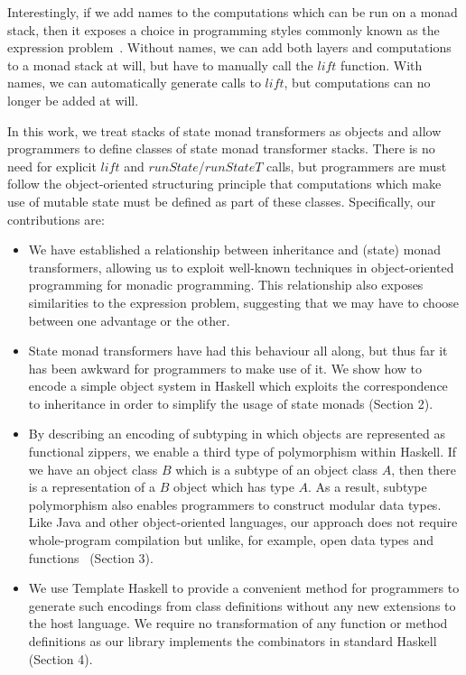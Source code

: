 Interestingly, if we add names to the computations which can be run on a monad stack, then it exposes a choice in programming styles commonly known as the expression problem~\cite{wadler1998expression}. Without names, we can add both layers and computations to a monad stack at will, but have to manually call the $\mathit{lift}$ function. With names, we can automatically generate calls to $\mathit{lift}$, but computations can no longer be added at will.

In this work, we treat stacks of state monad transformers as objects and allow programmers to define classes of state monad transformer stacks.
There is no need for explicit $\mathit{lift}$ and $\mathit{runState}$/$\mathit{runStateT}$ calls, but programmers
are must follow the object-oriented structuring principle that
computations which make use of mutable state must be defined
as part of these classes.
Specifically, our contributions are:
\begin{itemize}
    \item We have established a relationship between inheritance and (state) monad transformers, allowing us to exploit well-known techniques in object-oriented programming for monadic programming. This relationship also exposes similarities to the expression problem, suggesting that we may have to choose between one advantage or the other.
    \item State monad transformers have had this behaviour all along, but thus far it has been awkward for programmers to make use of it. We show how to encode a simple object system in Haskell which exploits the correspondence to inheritance in order to simplify the usage of state monads (Section 2).
    \item By describing an encoding of subtyping in which objects are represented as functional zippers, we enable a third type of polymorphism within Haskell. If we have an object class $B$ which is a subtype of an object class $A$, then there is a representation of a $B$ object which has type $A$. As a result, subtype polymorphism also enables programmers to construct modular data types. Like Java and other object-oriented languages, our approach does not require whole-program compilation but unlike, for example, open data types and functions~\cite{loh2006open} (Section 3).
    \item We use Template Haskell to provide a convenient method for programmers to generate such encodings from class definitions without any new extensions to the host language. We require no transformation of any function or method definitions as our library implements the combinators in standard Haskell (Section 4).
\end{itemize}

\pagebreak
